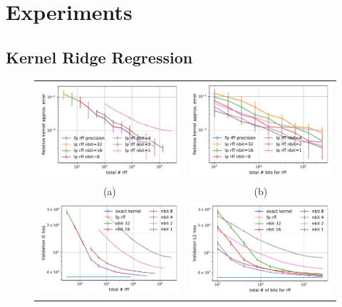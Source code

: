\section{Experiments}
\label{sec:experiments}
\subsection{Kernel Ridge Regression}
\begin{figure}
\centering
\begin{tabular}{c c}
	\includegraphics[width=.45\linewidth]{figures/kernel_approx_error_n_fp.pdf} &
	\includegraphics[width=.45\linewidth]{figures/kernel_approx_error.pdf} \\
	(a) & (b) \\
	\includegraphics[width=.45\linewidth]{figures/valid_l2_n_fp.pdf} &
	\includegraphics[width=.45\linewidth]{figures/valid_l2.pdf}  \\

\end{tabular}
\end{figure}

